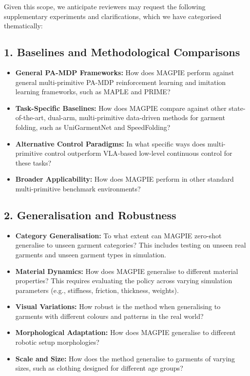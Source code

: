 \documentclass[journal]{IEEEtran}
\begin{document}
Given this scope, we anticipate reviewers may request the following supplementary experiments and clarifications, which we have categorised thematically:

\subsection*{1. Baselines and Methodological Comparisons}
\begin{itemize}
    \item \textbf{General PA-MDP Frameworks:} How does MAGPIE perform against general multi-primitive PA-MDP reinforcement learning and imitation learning frameworks, such as MAPLE and PRIME?
    \item \textbf{Task-Specific Baselines:} How does MAGPIE compare against other state-of-the-art, dual-arm, multi-primitive data-driven methods for garment folding, such as UniGarmentNet and SpeedFolding?
    \item \textbf{Alternative Control Paradigms:} In what specific ways does multi-primitive control outperform VLA-based low-level continuous control for these tasks?
    \item \textbf{Broader Applicability:} How does MAGPIE perform in other standard multi-primitive benchmark environments?
\end{itemize}

\subsection*{2. Generalisation and Robustness}
\begin{itemize}
    \item \textbf{Category Generalisation:} To what extent can MAGPIE zero-shot generalise to unseen garment categories? This includes testing on unseen real garments and unseen garment types in simulation.
    \item \textbf{Material Dynamics:} How does MAGPIE generalise to different material properties? This requires evaluating the policy across varying simulation parameters (e.g., stiffness, friction, thickness, weights).
    \item \textbf{Visual Variations:} How robust is the method when generalising to garments with different colours and patterns in the real world?
    \item \textbf{Morphological Adaptation:} How does MAGPIE generalise to different robotic setup morphologies?
    \item \textbf{Scale and Size:} How does the method generalise to garments of varying sizes, such as clothing designed for different age groups?
\end{itemize}
\end{document}
